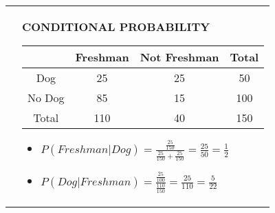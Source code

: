 \documentclass[6pt]{article}
\begin{document}
\begin{footnotesize}
\begin{tabular}{l | l}
{}

&

\parbox{0.5\textwidth}{
\begin{flushleft}
\textbf{CONDITIONAL PROBABILITY}
 \vspace{7px}

 \begin{tabular}{||c | c | c | c||} 
 \hline
  & Freshman & Not Freshman & Total \\
 \hline
 Dog & 25 & 25 & 50 \\ [0.5ex] 
 \hline
 No Dog & 85 & 15 & 100 \\ 
 \hline
 Total & 110 & 40 & 150 \\
 \hline
\end{tabular}

\begin{itemize}
\item $P(Freshman|Dog) = \frac{\frac{25}{150}}{\frac{25}{150} + \frac{25}{150}} = \frac{25}{50} = \frac{1}{2}$ 
\item $P(Dog|Freshman) = \frac{\frac{25}{100}}{\frac{110}{150}} = \frac{25}{110} = \frac{5}{22}$
\end{itemize}
\end{flushleft}
}

\end{tabular}
\end{footnotesize}
\end{document}
